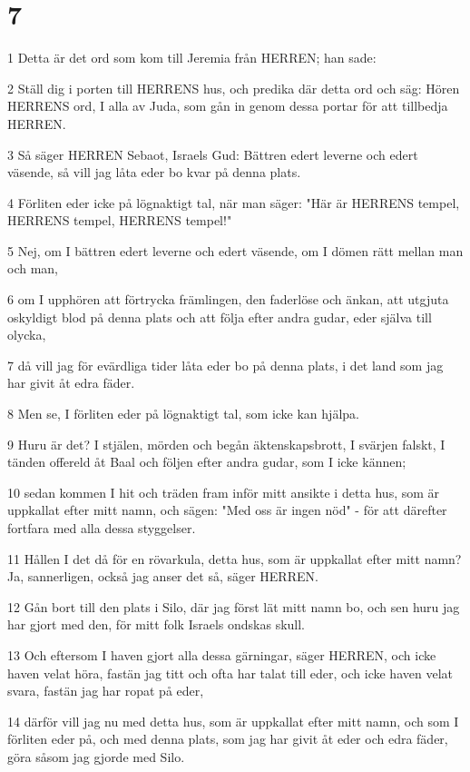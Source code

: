 \chapter{7}

\par 1 Detta är det ord som kom till Jeremia från HERREN; han sade:
\par 2 Ställ dig i porten till HERRENS hus, och predika där detta ord och säg: Hören HERRENS ord, I alla av Juda, som gån in genom dessa portar för att tillbedja HERREN.
\par 3 Så säger HERREN Sebaot, Israels Gud: Bättren edert leverne och edert väsende, så vill jag låta eder bo kvar på denna plats.
\par 4 Förliten eder icke på lögnaktigt tal, när man säger: "Här är HERRENS tempel, HERRENS tempel, HERRENS tempel!"
\par 5 Nej, om I bättren edert leverne och edert väsende, om I dömen rätt mellan man och man,
\par 6 om I upphören att förtrycka främlingen, den faderlöse och änkan, att utgjuta oskyldigt blod på denna plats och att följa efter andra gudar, eder själva till olycka,
\par 7 då vill jag för evärdliga tider låta eder bo på denna plats, i det land som jag har givit åt edra fäder.
\par 8 Men se, I förliten eder på lögnaktigt tal, som icke kan hjälpa.
\par 9 Huru är det? I stjälen, mörden och begån äktenskapsbrott, I svärjen falskt, I tänden offereld åt Baal och följen efter andra gudar, som I icke kännen;
\par 10 sedan kommen I hit och träden fram inför mitt ansikte i detta hus, som är uppkallat efter mitt namn, och sägen: "Med oss är ingen nöd" - för att därefter fortfara med alla dessa styggelser.
\par 11 Hållen I det då för en rövarkula, detta hus, som är uppkallat efter mitt namn? Ja, sannerligen, också jag anser det så, säger HERREN.
\par 12 Gån bort till den plats i Silo, där jag först lät mitt namn bo, och sen huru jag har gjort med den, för mitt folk Israels ondskas skull.
\par 13 Och eftersom I haven gjort alla dessa gärningar, säger HERREN, och icke haven velat höra, fastän jag titt och ofta har talat till eder, och icke haven velat svara, fastän jag har ropat på eder,
\par 14 därför vill jag nu med detta hus, som är uppkallat efter mitt namn, och som I förliten eder på, och med denna plats, som jag har givit åt eder och edra fäder, göra såsom jag gjorde med Silo.
